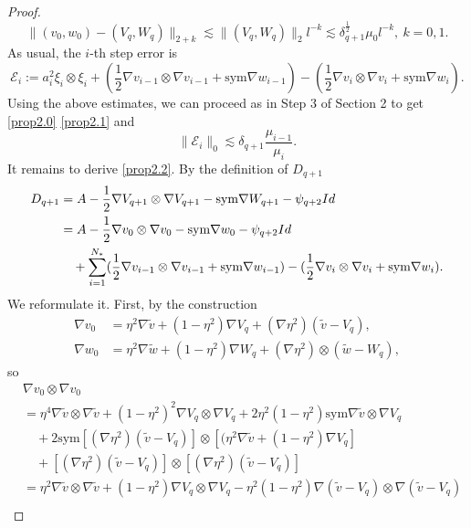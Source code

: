 \documentclass[reqno,12pt]{amsart}
\numberwithin{equation}{section}
\theoremstyle{plain}
\theoremstyle{definition}
\newcommand{\E}{\mathcal{E}}
\newcommand{\sym}{\text{sym}}
\begin{document}
\begin{proof}
\begin{equation*}
    \|(v_0,w_0)-(V_q,W_q)\|_{2+k}\lesssim \|(V_q,W_q)\|_2 l^{-k}\lesssim\delta_{q+1}^\frac{1}{2}\mu_0 l^{-k},\  k= 0,1.
\end{equation*}
As usual, the $i$-th step error is
\begin{equation}
    \E_i:={a}_i^2 \xi_i\otimes \xi_i
    +(\frac{1}{2}\nabla  {v}_{i-1}\otimes\nabla  {v}_{i-1}+\sym\nabla   {w}_{i-1})
    -(\frac{1}{2}\nabla  {v}_i\otimes\nabla  {v}_i+\sym\nabla   {w}_i).
\end{equation}
Using the above estimates, we can proceed as in Step 3 of Section 2 to get \eqref{prop2.0} \eqref{prop2.1} and
\begin{equation}\label{dddd}
    \|\E_i\|_0\lesssim \delta_{q+1}\frac{\mu_{i-1}}{\mu_i}.
\end{equation}
It remains to derive \eqref{prop2.2}. By the definition of $D_{q+1}$
\begin{align}
    D_{q+1} &= A-\frac{1}{2}\nabla V_{q+1}\otimes\nabla V_{q+1}-\sym\nabla W_{q+1}-\psi_{q+2}Id \notag\\
    &= A-\frac{1}{2}\nabla v_0\otimes\nabla v_0-\sym\nabla w_0-\psi_{q+2}Id \label{ttt}\\
    &\quad+\sum_{i=1}^{N_*}(\frac{1}{2}\nabla  {v}_{i-1}\otimes\nabla  {v}_{i-1}+\sym\nabla   {w}_{i-1})
    -(\frac{1}{2}\nabla  {v}_i\otimes\nabla  {v}_i+\sym\nabla   {w}_i). \label{sss}
\end{align}
We reformulate it. First, by the construction
\begin{align*}
    \nabla v_0 &= \eta^2\nabla\tilde v +(1-\eta^2)\nabla V_q +(\nabla\eta^2)(\tilde v-V_q),\\
    \nabla w_0 &= \eta^2\nabla\tilde w +(1-\eta^2)\nabla W_q +(\nabla\eta^2)\otimes(\tilde w-W_q),
\end{align*}
so
\begin{align*}
    &\nabla v_0\otimes \nabla v_0\\
    &= \eta^4\nabla \tilde v\otimes\nabla\tilde v +(1-\eta^2)^2\nabla V_q\otimes\nabla V_q +2\eta^2(1-\eta^2)\sym\nabla\tilde v\otimes\nabla V_q\\
    &\quad +2\sym[(\nabla \eta^2)(\tilde v-V_q)]\otimes[(\eta^2\nabla\tilde v+(1-\eta^2)\nabla V_q]\\
    &\quad +[(\nabla \eta^2)(\tilde v-V_q)]\otimes[(\nabla \eta^2)(\tilde v-V_q)]\\
    &= \eta^2\nabla\tilde v\otimes\nabla\tilde v +(1-\eta^2)\nabla V_q\otimes\nabla V_q -\eta^2(1-\eta^2)\nabla(\tilde v-V_q)\otimes\nabla(\tilde v-V_q)\\

\end{align*}
\end{proof}
\end{document}
